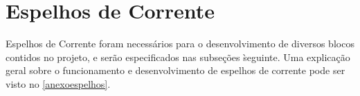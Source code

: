 \section{Espelhos de Corrente}

Espelhos de Corrente foram necess\'arios para o desenvolvimento de diversos blocos contidos no projeto, e ser\~ao especificados nas subse{\c c}\~oes \` seguinte. Uma explica{\c c}\~ao geral sobre o funcionamento e desenvolvimento de espelhos de corrente pode ser visto no \autoref{anexoespelhos}.



